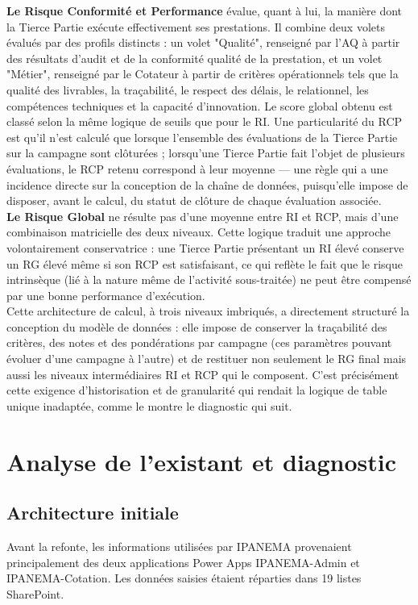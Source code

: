 \textbf{Le Risque Conformité et Performance} évalue, quant à lui, la manière dont la Tierce 
Partie exécute effectivement ses prestations. Il combine deux volets évalués par des profils 
distincts : un volet "Qualité", renseigné par l'AQ à partir des résultats d'audit et de la conformité 
qualité de la prestation, et un volet "Métier", renseigné par le Cotateur à partir de critères 
opérationnels tels que la qualité des livrables, la traçabilité, le respect des délais, le relationnel, 
les compétences techniques et la capacité d'innovation. Le score global obtenu est classé 
selon la même logique de seuils que pour le RI. Une particularité du RCP est qu'il n'est calculé 
que lorsque l'ensemble des évaluations de la Tierce Partie sur la campagne sont clôturées ; 
lorsqu'une Tierce Partie fait l'objet de plusieurs évaluations, le RCP retenu correspond à leur 
moyenne — une règle qui a une incidence directe sur la conception de la chaîne de données, 
puisqu'elle impose de disposer, avant le calcul, du statut de clôture de chaque évaluation 
associée.\\

\textbf{Le Risque Global} ne résulte pas d'une moyenne entre RI et RCP, mais d'une 
combinaison matricielle des deux niveaux. Cette logique traduit une approche volontairement 
conservatrice : une Tierce Partie présentant un RI élevé conserve un RG élevé même si son 
RCP est satisfaisant, ce qui reflète le fait que le risque intrinsèque (lié à la nature même de 
l'activité sous-traitée) ne peut être compensé par une bonne performance d'exécution. 
\\
Cette architecture de calcul, à trois niveaux imbriqués, a directement structuré la 
conception du modèle de données : elle impose de conserver la traçabilité des critères, des 
notes et des pondérations par campagne (ces paramètres pouvant évoluer d'une campagne 
à l'autre) et de restituer non seulement le RG final mais aussi les niveaux intermédiaires RI et 
RCP qui le composent. C'est précisément cette exigence d'historisation et de granularité qui 
rendait la logique de table unique inadaptée, comme le montre le diagnostic qui suit. 

\section{Analyse de l’existant et diagnostic}
\subsection{Architecture initiale}
Avant la refonte, les informations utilisées par IPANEMA provenaient principalement des 
deux applications Power Apps IPANEMA-Admin et IPANEMA-Cotation. Les données saisies 
étaient réparties dans 19 listes SharePoint.\\

